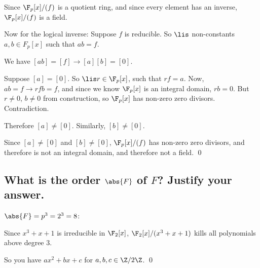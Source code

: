             Since $\F_p[x] / (f)$ is a quotient ring, and since every element has an inverse,
            $\F_p[x] / (f)$ is a field.

            Now for the logical inverse: Suppose $f$ is reducible.
            So $\lis$ non-constants $a,b \in F_p[x]$ such that $ab = f$.
            
            We have
            \(
                [ab] = [f] \to
                [a][b] = [0]
            \).

            Suppose $[a] = [0]$.
            So $\lis r \in \F_p[x]$, such that $rf = a$.
            Now, $ab = f \to rfb = f$,
            and since we know $\F_p[x]$ is an integral domain, $rb = 0$.
            But $r \neq 0$, $b \neq 0$ from construction, so $\F_p[x]$ has non-zero zero divisors.
            Contradiction.

            Therefore $[a] \neq [0]$.
            Similarly, $[b] \neq [0]$.

            Since $[a] \neq [0]$ and $[b] \neq [0]$, $\F_p[x] / (f)$ has non-zero zero divisors,
            and therefore is not an integral domain, 
            and therefore not a field.
            \qed
            
    \subsection[(iii)]{What is the order $\abs{F}$ of $F$? Justify your answer.}
        $\abs{F} = p^3 = 2^3 = 8$:
        
        Since $x^3+x+1$ is irreducible in $\F_2[x]$,
        $\F_2[x]/(x^3+x+1)$ kills all polynomials above degree $3$.

        So you have $ax^2 + bx + c$ for $a,b,c \in \Z/2\Z$.
        \qed

